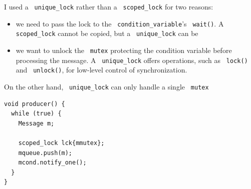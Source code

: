 \documentclass[11pt]{article}
\let\OldTexttt\texttt
\renewcommand{\texttt}[1]{\OldTexttt{\color{MidnightBlue} #1}}
\begin{document}
I used a \texttt{unique\_lock} rather than a \texttt{scoped\_lock} for two reasons:
\begin{itemize}
\item we need to pass the lock to the \texttt{condition\_variable}'s \texttt{wait()}. A \texttt{scoped\_lock} cannot be copied,
but a \texttt{unique\_lock} can be
\item we want to unlock the \texttt{mutex} protecting the condition variable before processing the message. A
\texttt{unique\_lock} offers operations, such as \texttt{lock()} and \texttt{unlock()}, for low-level control of
synchronization.
\end{itemize}

On the other hand, \texttt{unique\_lock} can only handle a single \texttt{mutex}

\begin{verbatim}
void producer() {
  while (true) {
    Message m;

    scoped_lock lck{mmutex};
    mqueue.push(m);
    mcond.notify_one();
  }
}
\end{verbatim}
\end{document}

